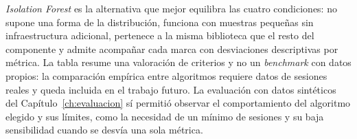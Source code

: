 \textit{Isolation Forest} es la alternativa que mejor equilibra las cuatro condiciones: no supone una forma de la distribución, funciona con muestras pequeñas sin infraestructura adicional, pertenece a la misma biblioteca que el resto del componente y admite acompañar cada marca con desviaciones descriptivas por métrica. La tabla resume una valoración de criterios y no un \textit{benchmark} con datos propios: la comparación empírica entre algoritmos requiere datos de sesiones reales y queda incluida en el trabajo futuro. La evaluación con datos sintéticos del Capítulo~\ref{ch:evaluacion} sí permitió observar el comportamiento del algoritmo elegido y sus límites, como la necesidad de un mínimo de sesiones y su baja sensibilidad cuando se desvía una sola métrica.

